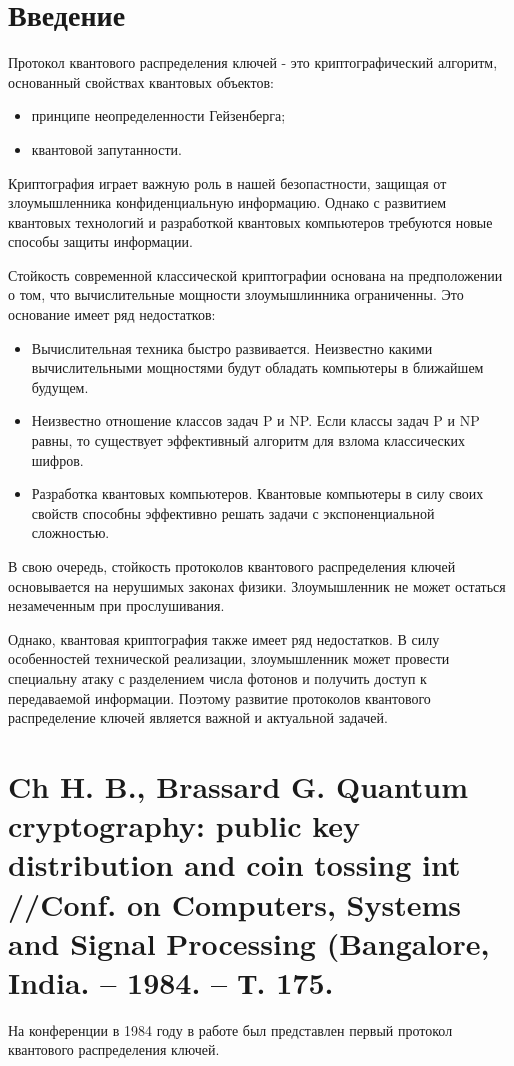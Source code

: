





\section*{Введение}
Протокол квантового распределения ключей - это криптографический алгоритм, основанный свойствах квантовых объектов:

\begin{itemize}
\item принципе неопределенности Гейзенберга;
\item квантовой запутанности.
\end{itemize}

Криптография играет важную роль в нашей безопастности, защищая от злоумышленника конфиденциальную информацию. Однако с развитием квантовых технологий и разработкой квантовых компьютеров требуются новые способы защиты информации.

Стойкость современной классической криптографии основана на предположении о том, что вычислительные мощности злоумышлинника ограниченны. Это основание имеет ряд недостатков:

\begin{itemize}
\item Вычислительная техника быстро развивается. Неизвестно какими вычислительными мощностями будут обладать компьютеры в ближайшем будущем.
\item Неизвестно отношение классов задач P и NP. Если классы задач P и NP равны, то существует эффективный алгоритм для взлома классических шифров.
\item Разработка квантовых компьютеров. Квантовые компьютеры в силу своих свойств способны эффективно решать задачи с экспоненциальной сложностью.
\end{itemize}

В свою очередь, стойкость протоколов квантового распределения ключей основывается на нерушимых законах физики. Злоумышленник не может остаться незамеченным при прослушивания.

Однако, квантовая криптография также имеет ряд недостатков. В силу особенностей технической реализации, злоумышленник может провести специальну атаку с разделением числа фотонов и получить доступ к передаваемой информации. Поэтому развитие протоколов квантового распределение ключей является важной и актуальной задачей.


\section{Ch H. B., Brassard G. Quantum cryptography: public key distribution and coin tossing int //Conf. on Computers, Systems and Signal Processing (Bangalore, India. – 1984. – Т. 175.}
На конференции в 1984 году в работе \cite{ch1984quantum} был представлен первый протокол квантового распределения ключей.

